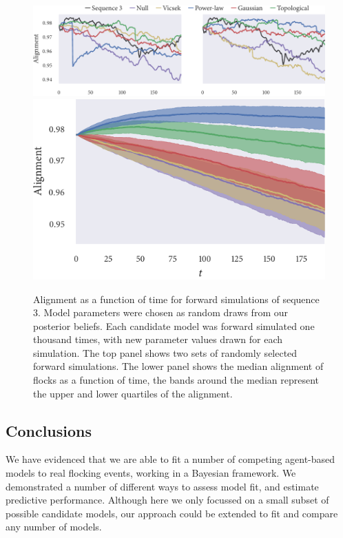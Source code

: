 \begin{figure}[tbp]
  \includegraphics{alignment/alignment_single_3.pdf}\vspace{1em}\\
  \includegraphics{alignment/alignment_ensemble_3.pdf}
  \caption{Alignment as a function of time for forward simulations of sequence
    $3$. Model parameters were chosen as random draws from our posterior
    beliefs. Each candidate model was forward simulated one thousand times,
    with new parameter values drawn for each simulation. The top panel shows two
    sets of randomly selected forward simulations. The lower panel shows the
    median alignment of flocks as a function of time, the bands around the
    median represent the upper and lower quartiles of the alignment.}
  \label{fig:checks_seq3}
\end{figure}

\subsection{Conclusions}

We have evidenced that we are able to fit a number of competing agent-based
models to real flocking events, working in a Bayesian framework. We
demonstrated a number of different ways to assess model fit, and estimate
predictive performance. Although here we only focussed on a small subset of
possible candidate models, our approach could be extended to fit and compare
any number of models.

